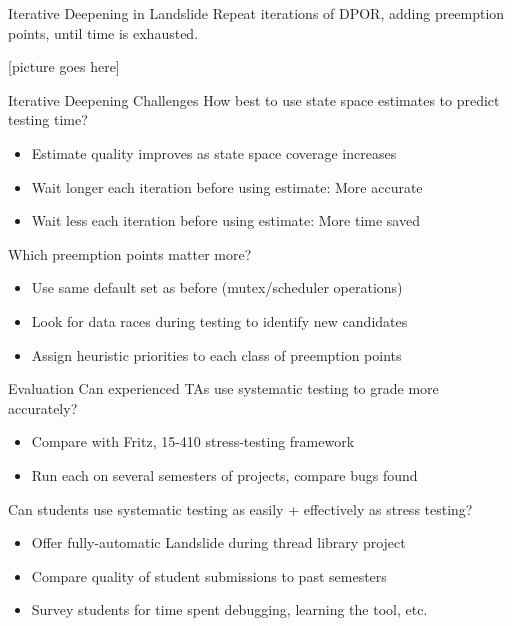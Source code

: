 \documentclass[xcolor=dvipsnames]{beamer}
\begin{document}
\begin{frame}{Iterative Deepening in Landslide}
	Repeat iterations of DPOR, adding preemption points, until time is exhausted.
	\pause
	\linegap

	[picture goes here]
\end{frame}
\begin{frame}{Iterative Deepening Challenges}
	How best to use state space estimates to predict testing time?
	\begin{itemize}
		\item Estimate quality improves as state space coverage increases
		\item Wait longer each iteration before using estimate: More accurate
		\item Wait less each iteration before using estimate: More time saved
	\end{itemize}
	\pause
	Which preemption points matter more? %
	\begin{itemize}
		\item Use same default set as before (mutex/scheduler operations)
		\item Look for data races during testing to identify new candidates
		\item Assign heuristic priorities to each class of preemption points
	\end{itemize}
\end{frame}

\begin{frame}{Evaluation}
	Can experienced TAs use systematic testing to grade more accurately?
	\begin{itemize}
		\item Compare with Fritz, 15-410 stress-testing framework
		\item Run each on several semesters of projects, compare bugs found
	\end{itemize}
	\pause
	\linegap

	Can students use systematic testing as easily + effectively as stress testing?
	\begin{itemize}
		\item Offer fully-automatic Landslide during thread library project
		\item Compare quality of student submissions to past semesters
		\item Survey students for time spent debugging, learning the tool, etc.
	\end{itemize}
\end{frame}
\end{document}
